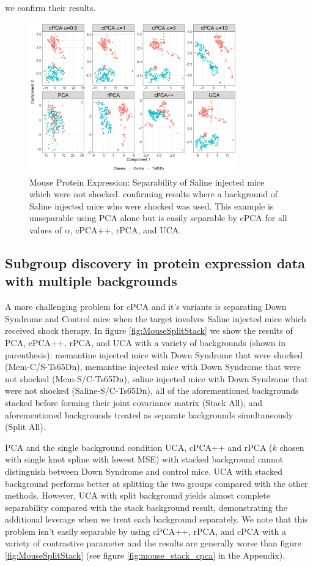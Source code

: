 \documentclass[12pt]{article}
\begin{document}
\cite{Abid} we confirm their results. 
\begin{figure}[t]
    \centering
	\includegraphics[width = 0.8\textwidth]{figure/Mouse_Data.png}
	\caption{Mouse Protein Expression: Separability of Saline injected mice which were not shocked. confirming  \cite{Abid} results where a background of Saline injected mice who were shocked was used. This example is unseparable using PCA alone but is easily separable by cPCA for all values of $\alpha$, cPCA++, rPCA, and UCA.}
	\label{fig:Mouse}
\end{figure}

\subsection{Subgroup discovery in protein expression data with multiple backgrounds}
A more challenging problem for cPCA and it's variants is separating Down Syndrome and Control mice when the target involves Saline injected mice which received shock therapy. In figure \ref{fig:MouseSplitStack} we show the results of PCA, cPCA++, rPCA, and UCA with a variety of backgrounds (shown in parenthesis): memantine injected mice with Down Syndrome that were shocked (Mem-C/S-Ts65Dn), memantine injected mice with Down Syndrome that were not shocked (Mem-S/C-Ts65Dn), saline injected mice with Down Syndrome that were not shocked (Saline-S/C-Ts65Dn), all of the aforementioned backgrounds stacked before forming their joint covariance matrix (Stack All), and aforementioned backgrounds treated as separate backgrounds simultaneously (Split All). 

PCA and the single background condition UCA, cPCA++ and rPCA ($k$ chosen with single knot spline with lowest MSE) with stacked background cannot distinguish between Down Syndrome and control mice. UCA with stacked background performs better at splitting the two groups compared with the other methods.  However, UCA with split background yields almost complete separability compared with the stack background result, demonstrating the additional leverage when we treat each background separately.
We note that this problem isn't easily separable by using cPCA++, rPCA, and cPCA with a variety of contrastive parameter and the results are generally worse than figure \ref{fig:MouseSplitStack} (see figure \ref{fig:mouse_stack_cpca} in the Appendix). 
\end{document}
